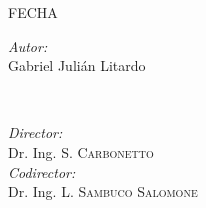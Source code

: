\begin{titlepage}
\begin{center}
    \vspace*{1.5cm}
    
    \begin{large}
    FECHA\\
    \end{large}
    
  \end{center}  
  \vspace*{1cm}

  \begin{minipage}{0.5\textwidth}
    \begin{flushleft} \large
      \emph{Autor:}\\
       Gabriel Julián Litardo \\
    \end{flushleft}
  \end{minipage}
  ~
  \begin{minipage}{0.5\textwidth}
    \begin{flushright} \large
      \emph{Director:} \\
      Dr. Ing. S. \textsc{Carbonetto} \\
      \emph{Codirector:} \\
      Dr. Ing. L. \textsc{Sambuco Salomone} \\
    \end{flushright}
  \end{minipage}
  
\end{titlepage}








